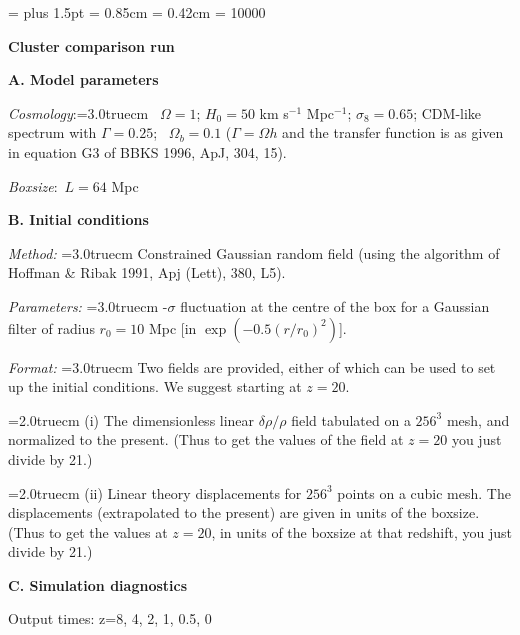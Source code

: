 \magnification=
\baselineskip 12pt
\parskip 8pt plus 1.5pt
\parindent=0pt
\bigskipamount = 0.85cm
\medskipamount = 0.42cm
\raggedbottom
\tolerance = 10000
\def\Mo{${\rm M_\odot}$}
\def\1item{\hangindent=1.0truecm \hangafter=1 \noindent}
\def\2item{\hangindent=2.0truecm \hangafter=1 \noindent}
\def\3item{\hangindent=3.0truecm \hangafter=1 \noindent}

\centerline{\bf Cluster comparison run}

{\bf A. Model parameters }

{\it Cosmology}:\3item \quad \ $\Omega=1$; $H_0=50$ km s$^{-1}$ Mpc$^{-1}$;
$\sigma_8=0.65$; CDM-like spectrum with $\Gamma=0.25$; \ $\Omega_b=0.1$ 
($\Gamma=\Omega h$ and the transfer function is as given in equation G3 of
BBKS 1996, ApJ, 304, 15).
                       
{\it Boxsize}:\quad\qquad\          $L=64$ Mpc 


{\bf B. Initial conditions} 

{\it Method:}  \3item Constrained Gaussian random field (using the
                      algorithm of Hoffman \& Ribak 1991, Apj (Lett), 
                      380, L5). 

{\it Parameters:} \3item 3-$\sigma$ fluctuation at the centre of the box for a 
      Gaussian filter of radius $r_0 = 10$ Mpc [in $\exp(-0.5(r/r_0)^2)$].

{\it Format:} \3item  Two fields are provided, either of which can be used to
                 set up the initial conditions. We suggest starting at $z=20$.

\qquad \2item    (i)  The dimensionless linear $\delta \rho/\rho$ field tabulated on 
                      a $256^3$ mesh, and normalized to the present.
                      (Thus to get the values of the field at $z=20$ 
                        you just divide by 21.)

\qquad \2item    (ii) Linear theory displacements for $256^3$ points on a
                      cubic mesh. The displacements (extrapolated to the 
                      present) are given in units of the boxsize. (Thus to 
                      get the values at $z=20$, in units of the boxsize at
                      that redshift, you just divide by 21.)

{\bf C. Simulation diagnostics} 

\qquad\qquad\qquad                Output times:     z=8, 4, 2, 1, 0.5, 0                 

